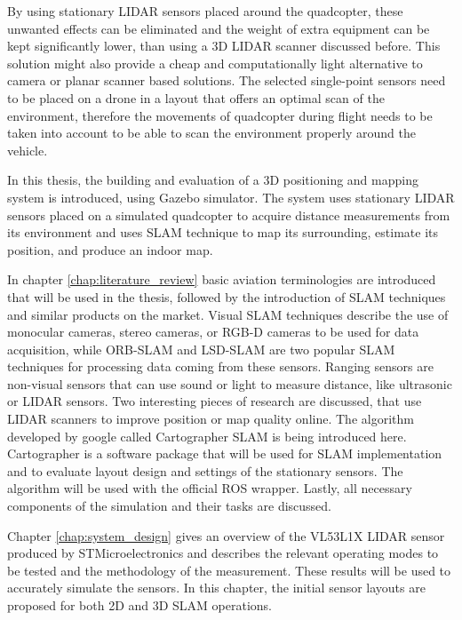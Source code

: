 By using stationary LIDAR sensors placed around the quadcopter, these unwanted effects can be eliminated and the weight of 
extra equipment can be kept significantly lower, than using a 3D LIDAR scanner discussed before. This solution might also
provide a cheap and computationally light alternative to camera or planar scanner based solutions. 
The selected single-point sensors need to be placed on a drone in a layout that offers an optimal scan of the
environment, therefore the movements of quadcopter during flight needs to be taken into account to be able to scan the
environment properly around the vehicle.

In this thesis, the building and evaluation of a 3D positioning and mapping system is introduced, using Gazebo simulator. 
The system uses stationary LIDAR sensors placed on a simulated quadcopter to acquire distance measurements from its 
environment and uses SLAM technique to map its surrounding, estimate its position, and produce an indoor map. 

In chapter \ref{chap:literature_review} basic aviation terminologies are introduced that will be used in the thesis, followed
by the introduction of SLAM techniques and similar products on the market. Visual SLAM techniques describe the use of monocular 
cameras, stereo cameras, or RGB-D cameras to be used for data acquisition, while ORB-SLAM and LSD-SLAM are two popular SLAM
techniques for processing data coming from these sensors. Ranging sensors are non-visual sensors that can use sound
or light to measure distance, like ultrasonic or LIDAR sensors. Two interesting pieces of research are discussed, that use 
LIDAR scanners to improve position or map quality online. The algorithm developed by google called Cartographer SLAM 
is being introduced here. Cartographer is a software package that will be used for SLAM implementation and to evaluate 
layout design and settings of the stationary sensors. The algorithm will be used with the official ROS wrapper.
Lastly, all necessary components of the simulation and their tasks are discussed. 
 
Chapter \ref{chap:system_design} gives an overview of the VL53L1X LIDAR sensor produced by STMicroelectronics and describes the
relevant operating modes to be tested and the methodology of the measurement. These results will be used to accurately simulate
the sensors. In this chapter, the initial sensor layouts are proposed for both 2D and 3D SLAM operations.

